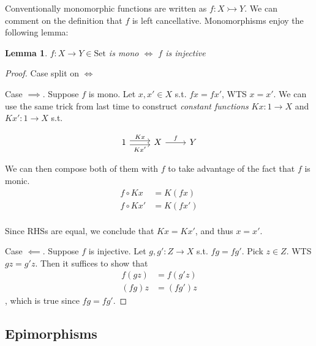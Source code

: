 \documentclass[12pt]{article}
\theoremstyle{plain}
\newtheorem{lemma}{Lemma}
\theoremstyle{definition}
\theoremstyle{remark}
\newcommand{\Set}{\mathrm{Set}}
\begin{document}
Conventionally monomorphic functions are written as $f : X \rightarrowtail Y$.
We can comment on the definition that $f$ is left cancellative. Monomorphisms enjoy the following lemma:

\begin{lemma}
  $f: X \rightarrow Y \in \Set$ is mono $\iff$ $f$ is injective
\end{lemma}\label{lemma:mono-iff-injective}


\begin{proof} Case split on $\iff$

  Case $\implies$. Suppose $f$ is mono. Let $x, x' \in X$ s.t. $f x = f x'$, WTS $x = x'$. We can use the same trick from last time to construct \emph{constant functions} $K x: 1 \to X$ and $K x': 1 \to X$ s.t.

  \[\begin{tikzcd}
    1 & X & Y
    \arrow["{K x}", shift left, from=1-1, to=1-2]
    \arrow["{K x'}"', shift right, from=1-1, to=1-2]
    \arrow["f", from=1-2, to=1-3]
  \end{tikzcd}\]

  We can then compose both of them with $f$ to take advantage of the fact that $f$ is monic.
  \begin{align*}
    f \circ K x &= K (f x) \\
    f \circ K x' &= K (f x') \\
  \end{align*}

  Since RHSs are equal, we conclude that $K x = K x'$, and thus $x = x'$.

  Case $\impliedby$. Suppose $f$ is injective. Let $g, g' : Z \to X$ s.t. $f g = f g'$. Pick $z \in Z$. WTS $g z = g' z$. Then it suffices to show that \begin{align*}
    f (g z) &= f (g' z) \\
    (f g) z &= (f g') z
  \end{align*}
  , which is true since $f g = f g'$.
\end{proof}

\subsection{Epimorphisms}
\end{document}
